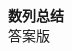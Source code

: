 \documentclass[zihao=-4]{exam-zh}
\begin{document}
\begin{center}
  {\bfseries 数列总结}\\[4pt]
  { 答案版}
\end{center}

\end{document}
